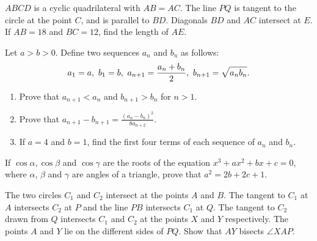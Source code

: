 \begin{problems}
    \problem $ABCD$ is a cyclic quadrilateral with $AB = AC$. The line $PQ$ is
    tangent to the circle at the point $C$, and is parallel to $BD$. Diagonals
    $BD$ and $AC$ intersect at $E$. If $AB = 18$ and $BC = 12$, find the length
    of $AE$. 
    
    \problem Let $a > b > 0$. Define two sequences $a_{n}$ and $b_{n}$ as
    follows:
    \[a_{1} = a,\text{\space} b_{1} = b,\text{\space} a_{n + 1} = \frac{a_{n} +
    b_{n}}{2},\text{\space} b_{n + 1} = \sqrt{a_{n}b_{n}}.\]
    \begin{enumerate}
        \item Prove that $a_{n + 1} < a_{n}$ and $b_{n + 1} > b_{n}$ for $n >
            1$. 
        
        \item Prove that $a_{n + 1} - b_{n + 1} = \frac{(a_{n} -
            b_{n})^2}{8a_{n + 2}}$. 
        
        \item If $a = 4$ and $b = 1$, find the first four terms of each
            sequence of $a_{n}$ and $b_{n}$.
    \end{enumerate}
    
    \problem If $\cos\alpha, \cos\beta$ and $\cos\gamma$ are the roots of the
    equation $x^3 + ax^2 + bx + c = 0$, where $\alpha$, $\beta$ and $\gamma$
    are angles of a triangle, prove that $a^2 = 2b + 2c + 1$. 
    
    \problem The two circles $C_{1}$ and $C_{2}$ intersect at the points $A$
    and $B$. The tangent to $C_{1}$ at $A$ intersects $C_{2}$ at $P$ and the
    line $PB$ intersects $C_{1}$ at $Q$. The tangent to $C_{2}$ drawn from $Q$
    intersects $C_{1}$ and $C_{2}$ at the points $X$ and $Y$ respectively. The
    points $A$ and $Y$ lie on the different sides of $PQ$. Show that $AY$
    bisects $\angle XAP$. 
\end{problems}
